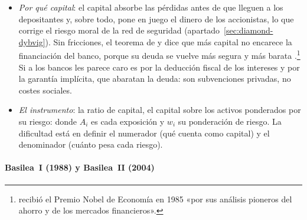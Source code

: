 \documentclass[11pt]{article}
\begin{document}
\begin{itemize}
\item \emph{Por qué capital}: el capital absorbe las pérdidas antes de que lleguen a los depositantes y, sobre todo, pone en juego el dinero de los accionistas, lo que corrige el riesgo moral de la red de seguridad (apartado~\ref{sec:diamond-dybvig}). Sin fricciones, el teorema de  y  dice que más capital no encarece la financiación del banco, porque su deuda se vuelve más segura y más barata .\footnote{ recibió el Premio Nobel de Economía en 1985 «por sus análisis pioneros del ahorro y de los mercados financieros»\nocite{Nobel1985Modigliani,ModiglianiMiller1958Cost}.} Si a los bancos les parece caro es por la deducción fiscal de los intereses y por la garantía implícita, que abaratan la deuda: son subvenciones privadas, no costes sociales\nocite{AdmatiHellwig2013}.
\item \emph{El instrumento}: la ratio de capital, el capital sobre los activos ponderados por su riesgo:
  donde $A_i$ es cada exposición y $w_i$ su ponderación de riesgo. La dificultad está en definir el numerador (qué cuenta como capital) y el denominador (cuánto pesa cada riesgo).
\end{itemize}

\paragraph{Basilea~I (1988) y Basilea~II (2004)}
\end{document}
